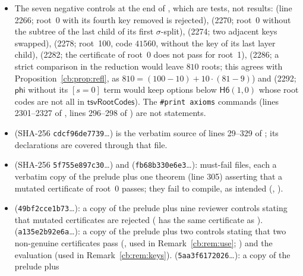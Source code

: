 \begin{itemize}
\item The seven negative controls at the end of , which are tests, not results:
   (line 2266; root~0 with its fourth key removed is rejected),
   (2270; root~0 without the subtree of the last child of its first $\sigma$-split),
   (2274; two adjacent keys swapped),  (2278; root~100,
  code $41560$, without the key of its last layer child),  (2282; the certificate of root~0
  does not pass for root~1),  (2286; a strict comparison in the reduction would leave
  $810$ roots; this agrees with Proposition~\ref{cb:prop:refl}, as $810=(100-10)+10\cdot(81-9)$) and
   (2292; $\mathsf{phi}$ without its $[s=0]$ term would keep options below $\mathsf{H6}(1,0)$
  whose root codes are not all in $\mathsf{tsvRootCodes}$). The \texttt{\#print axioms} commands (lines 2301--2327 of
  , lines 296--298 of ) are not statements.
\item {} (SHA-256 \texttt{cdcf96de7739}\dots) is the verbatim source of lines 29--329 of
  ; its declarations are covered through that file.
\item {} (SHA-256 \texttt{5f755e897c30}\dots) and 
  (\texttt{fb68b330e6e3}\dots): must-fail files, each a verbatim copy of the prelude plus one theorem (line 305)
  asserting that a mutated certificate of root~0 passes; they fail to compile, as intended
  (, ).
\item {} (\texttt{49bf2cce1b73}\dots): a copy of the prelude plus nine reviewer
  controls stating that mutated certificates are rejected ( has the same certificate as
  ).  (\texttt{a135e2b92e6a}\dots): a copy of the prelude plus
  two controls stating that two non-genuine certificates pass (, used in
  Remark~\ref{cb:rem:use}; ) and the evaluation  (used in
  Remark~\ref{cb:rem:keys}).  (\texttt{5aa3f6172026}\dots): a copy of the prelude plus

\end{itemize}
